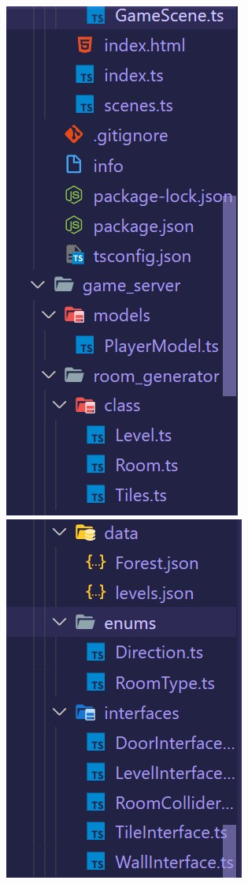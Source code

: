 \documentclass[oneside,12pt]{Classes/VTU}
\begin{document}
	\includegraphics[scale=0.68]{d2.jpg}
	\includegraphics[scale=0.69]{d3.jpg}
\end{document}
